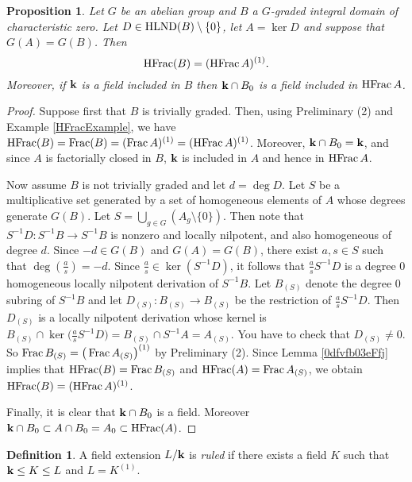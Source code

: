 \documentclass[12pt]{amsart}
\theoremstyle{plain}
\newcommand{\cyan}{\color{cyan}}
\newtheorem{proposition}[subsection]{Proposition}
\theoremstyle{definition}
\newtheorem{definition}[subsection]{Definition}
\newcommand{\Frac}{		\operatorname{{\rm Frac}}}
\newcommand{\HFrac}{		\operatorname{{\rm HFrac}}}
\newcommand{\bk}{{\ensuremath{\rm \bf k}}}
\newcommand{\hlnd}{\operatorname{{\rm HLND}}}
\begin{document}
	\begin{proposition} \label {mainResultGeneralized}
		Let $G$ be an abelian group and $B$ a $G$-graded integral domain of characteristic zero.
		Let $D \in \hlnd(B) \setminus \{0\}$, let $A = \ker D$ and suppose that $G(A) = G(B)$.
		Then 
		$$
		\HFrac(B) = (\HFrac A)^{(1)}.
		$$
		Moreover, if $\bk$ is a field included in $B$ then $\bk \cap B_0$ is a field included in $\HFrac A$.
	\end{proposition}
	
	\begin{proof}
		Suppose first that $B$ is trivially graded. Then, using Preliminary (2) and Example \ref{HFracExample}, we have $\HFrac(B) = \Frac(B) = (\Frac A)^{(1)}  = (\HFrac A)^{(1)}$. Moreover, $\bk \cap B_0 = \bk$, and since $A$ is factorially closed in $B$, $\bk$ is included in $A$ and hence in $\HFrac A$.
		
		Now assume $B$ is not trivially graded and let $d = \deg D$. Let $S$ be a multiplicative set generated by a set of homogeneous elements of $A$ whose degrees generate $G(B)$. Let $S = \bigcup_{g \in G} ( A_g \setminus \{0\})$. Then note that $S^{-1}D : S^{-1}B \to S^{-1}B$ is nonzero and locally nilpotent, and also homogeneous of degree $d$.
			Since $-d \in G(B)$ and $G(A) = G(B)$, there exist
		$a,s \in S$ such that $\deg(\frac{a}{s}) = -d$.  Since $\frac{a}{s} \in \ker(S^{-1}D)$,
		it follows that $\frac{a}{s} S^{-1}D$ is a degree 0 homogeneous locally nilpotent derivation of $S^{-1}B$.
		Let $B_{(S)}$ denote the degree 0 subring of $S^{-1}B$ and let $D_{(S)} : B_{(S)} \to B_{(S)}$ be the restriction of  $\frac{a}{s} S^{-1}D$. Then $D_{(S)}$ is a locally nilpotent derivation whose kernel is $B_{(S)} \cap \ker\big( \frac{a}{s} S^{-1}D \big) = B_{(S)} \cap S^{-1}A = A_{(S)}$.
		{\cyan You have to check that $D_{(S)} \neq 0$.}
		So $\Frac B_{(S)} = \big( \Frac A_{(S)} \big)^{(1)}$ by Preliminary (2). Since Lemma \ref{0dfvfb03eFfj} implies that $\HFrac(B) = \Frac B_{(S)}$ and $\HFrac(A) = \Frac A_{(S)}$, we obtain $\HFrac(B) = (\HFrac A)^{(1)}$.
		
		
		Finally, it is clear that $\bk \cap B_0$ is a field. Moreover $\bk \cap B_0 \subset A \cap B_0 = A_0 \subset \HFrac(A)$. 
		
		
	\end{proof}
		
	\begin{definition}
		A field extension $L / \bk$ is \textit{ruled} if there exists a field $K$ such that $\bk \leq K \leq L$ and $L = K^{(1)}$.  
	\end{definition}
	
\end{document}
